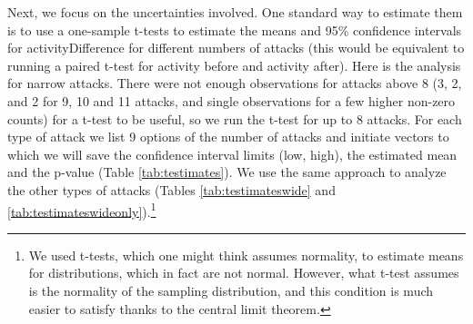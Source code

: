 \documentclass[10pt,dvipsnames]{scrartcl}
\begin{document}
Next, we focus on the uncertainties involved. One standard way to
estimate them is to use a one-sample t-tests to estimate the means and
95\% confidence intervals for \textsf{activityDifference} for different
numbers of attacks (this would be equivalent to running a paired t-test
for activity before and activity after). Here is the analysis for narrow
attacks. There were not enough observations for attacks above 8 (3, 2,
and 2 for 9, 10 and 11 attacks, and single observations for a few higher
non-zero counts) for a t-test to be useful, so we run the t-test for up
to 8 attacks. For each type of attack we list 9 options of the number of
attacks and initiate vectors to which we will save the confidence
interval limits (\textsf{low}, \textsf{high}), the estimated mean and
the \textsf{p}-value (Table \ref{tab:testimates}). We use the same
approach to analyze the other types of attacks (Tables
\ref{tab:testimateswide} and
\ref{tab:testimateswideonly}).\footnote{We used t-tests, which one might think assumes normality, to estimate means  for distributions, which in fact  are not normal. However, what t-test assumes is the normality of the sampling distribution, and this condition is much easier to satisfy thanks to the central limit theorem.}

\footnotesize

\normalsize

\footnotesize

\normalsize
\end{document}
